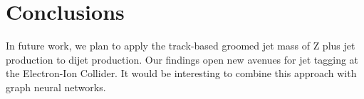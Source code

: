 \section{Conclusions}\label{sec:conclusions}

In future work, we plan to apply the track-based groomed jet mass of Z
plus jet production to dijet production. Our findings open new avenues
for jet tagging at the Electron-Ion Collider. It would be interesting to
combine this approach with graph neural networks.

